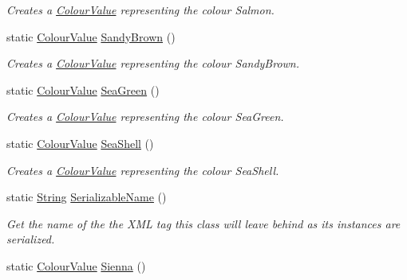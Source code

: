 \begin{DoxyCompactItemize}
\begin{DoxyCompactList}\small\item\em Creates a \hyperlink{classMezzanine_1_1ColourValue}{ColourValue} representing the colour Salmon. \item\end{DoxyCompactList}\item 
static \hyperlink{classMezzanine_1_1ColourValue}{ColourValue} \hyperlink{classMezzanine_1_1ColourValue_a9ac6855dd73d7fc2d700702ac8db36b4}{SandyBrown} ()
\begin{DoxyCompactList}\small\item\em Creates a \hyperlink{classMezzanine_1_1ColourValue}{ColourValue} representing the colour SandyBrown. \item\end{DoxyCompactList}\item 
static \hyperlink{classMezzanine_1_1ColourValue}{ColourValue} \hyperlink{classMezzanine_1_1ColourValue_ac13d3ac2c230416ea910e6b779e290bd}{SeaGreen} ()
\begin{DoxyCompactList}\small\item\em Creates a \hyperlink{classMezzanine_1_1ColourValue}{ColourValue} representing the colour SeaGreen. \item\end{DoxyCompactList}\item 
static \hyperlink{classMezzanine_1_1ColourValue}{ColourValue} \hyperlink{classMezzanine_1_1ColourValue_a7849f408af7baea5ccde49c25bdc2dd1}{SeaShell} ()
\begin{DoxyCompactList}\small\item\em Creates a \hyperlink{classMezzanine_1_1ColourValue}{ColourValue} representing the colour SeaShell. \item\end{DoxyCompactList}\item 
static \hyperlink{namespaceMezzanine_acf9fcc130e6ebf08e3d8491aebcf1c86}{String} \hyperlink{classMezzanine_1_1ColourValue_acf9ba5b049a46a34c9405da27d9e1c5e}{SerializableName} ()
\begin{DoxyCompactList}\small\item\em Get the name of the the XML tag this class will leave behind as its instances are serialized. \item\end{DoxyCompactList}\item 
static \hyperlink{classMezzanine_1_1ColourValue}{ColourValue} \hyperlink{classMezzanine_1_1ColourValue_a3240b52e74e5f62ddc9bf7d25b3322eb}{Sienna} ()

\end{DoxyCompactItemize}
